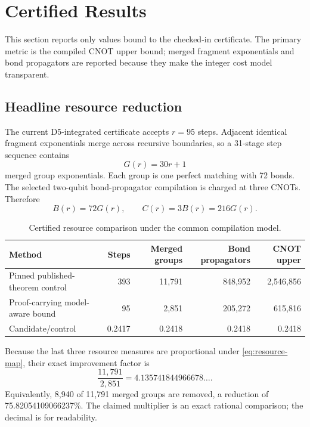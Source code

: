\section{Certified Results}
\label{sec:results}

This section reports only values bound to the checked-in certificate.  The
primary metric is the compiled CNOT upper bound; merged fragment
exponentials and bond propagators are reported because they make the integer
cost model transparent.

\subsection{Headline resource reduction}

The current D5-integrated certificate accepts $r=95$ steps.  Adjacent
identical fragment exponentials merge across recursive boundaries, so a
31-stage step sequence contains
\begin{equation}
  G(r)=30r+1
  \label{eq:merged-groups}
\end{equation}
merged group exponentials.  Each group is one perfect matching with 72 bonds.
The selected two-qubit bond-propagator compilation is charged at three CNOTs.
Therefore
\begin{equation}
  B(r)=72G(r),\qquad C(r)=3B(r)=216G(r).
  \label{eq:resource-map}
\end{equation}

\begin{table}[t]
\centering
\caption{Certified resource comparison under the common compilation model.}
\label{tab:headline-results}
\begin{tabular}{@{}lrrrr@{}}
\toprule
Method & Steps & Merged groups & Bond propagators & CNOT upper \\
\midrule
Pinned published-theorem control & 393 & 11,791 & 848,952 & 2,546,856 \\
Proof-carrying model-aware bound & 95 & 2,851 & 205,272 & 615,816 \\
\midrule
Candidate/control & 0.2417 & 0.2418 & 0.2418 & 0.2418 \\
\bottomrule
\end{tabular}
\end{table}

Because the last three resource measures are proportional under
\cref{eq:resource-map}, their exact improvement factor is
\begin{equation}
  \frac{11{,}791}{2{,}851}=4.135741844966678\ldots.
  \label{eq:exact-ratio}
\end{equation}
Equivalently, 8,940 of 11,791 merged groups are removed, a reduction of
75.82054109066237\%.  The claimed multiplier is an exact rational comparison;
the decimal is for readability.


